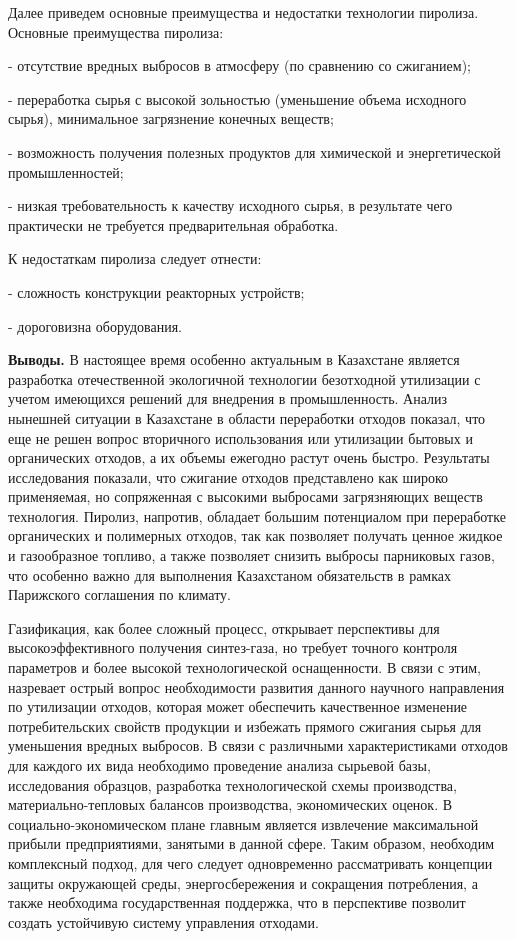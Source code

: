 Далее приведем основные преимущества и недостатки технологии пиролиза.
Основные преимущества пиролиза:

- отсутствие вредных выбросов в атмосферу (по срав­нению со сжиганием);

- переработка сырья с высокой зольностью (уменьше­ние объема исходного
сырья), минимальное загрязнение конечных веществ;

- возможность получения полезных продуктов для химической и
энергетической промышленностей;

- низкая требовательность к качеству исходного сырья, в результате чего
практически не требуется предвари­тельная обработка.

К недостаткам пиролиза следует отнести:

- сложность конструкции реакторных устройств;

- дороговизна оборудования.

{\bfseries Выводы.} В настоящее время особенно актуальным в Казахстане
является разработка отечественной экологичной технологии безотходной
утилизации с учетом имеющихся решений для внедрения в промышленность.
Анализ нынешней ситуации в Казахстане в области переработки отходов
показал, что еще не решен вопрос вторичного использования или утилизации
бытовых и органических отходов, а их объемы ежегодно растут очень
быстро. Результаты исследования показали, что сжигание отходов
представлено как широко применяемая, но сопряженная с высокими выбросами
загрязняющих веществ технология. Пиролиз, напротив, обладает большим
потенциалом при переработке органических и полимерных отходов, так как
позволяет получать ценное жидкое и газообразное топливо, а также
позволяет снизить выбросы парниковых газов, что особенно важно для
выполнения Казахстаном обязательств в рамках Парижского соглашения по
климату.~

Газификация, как более сложный процесс, открывает перспективы для
высокоэффективного получения синтез-газа, но требует точного контроля
параметров и более высокой технологической оснащенности. В связи с этим,
назревает острый вопрос необходимости развития данного научного
направления по утилизации отходов, которая может обеспечить качественное
изменение потребительских свойств продукции и избежать прямого сжигания
сырья для уменьшения вредных выбросов. В связи с различными
характеристиками отходов для каждого их вида необходимо проведение
анализа сырьевой базы, исследования образцов, разработка технологической
схемы производства, материально-тепловых балансов производства,
экономических оценок. В социально-экономическом плане главным является
извлечение максимальной прибыли предприятиями, занятыми в данной сфере.
Таким образом, необходим комплексный подход, для чего следует
одновременно рассматривать концепции защиты окружающей среды,
энергосбережения и сокращения потребления, а также необходима
государственная поддержка, что в перспективе позволит создать устойчивую
систему управления отходами.

